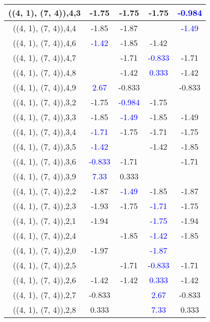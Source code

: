 \documentclass{article}
\begin{document}
\begin{center}
\begin{longtable}{|c|c|c|c|c|}
        	\hline
        	((4, 1), (7, 4)),4,3&-1.75&-1.75&-1.75& \textcolor{blue}{-0.984}\\
        	\hline
        	((4, 1), (7, 4)),4,4&-1.85&-1.87&& \textcolor{blue}{-1.49}\\
        	\hline
        	((4, 1), (7, 4)),4,6& \textcolor{blue}{-1.42}&-1.85&-1.42&\\
        	\hline
        	((4, 1), (7, 4)),4,7&&-1.71& \textcolor{blue}{-0.833}&-1.71\\
        	\hline
        	((4, 1), (7, 4)),4,8&&-1.42& \textcolor{blue}{0.333}&-1.42\\
        	\hline
        	((4, 1), (7, 4)),4,9& \textcolor{blue}{2.67}&-0.833&&-0.833\\
        	\hline
        	((4, 1), (7, 4)),3,2&-1.75& \textcolor{blue}{-0.984}&-1.75&\\
        	\hline
        	((4, 1), (7, 4)),3,3&-1.85& \textcolor{blue}{-1.49}&-1.85&-1.49\\
        	\hline
        	((4, 1), (7, 4)),3,4& \textcolor{blue}{-1.71}&-1.75&-1.71&-1.75\\
        	\hline
        	((4, 1), (7, 4)),3,5& \textcolor{blue}{-1.42}&&-1.42&-1.85\\
        	\hline
        	((4, 1), (7, 4)),3,6& \textcolor{blue}{-0.833}&-1.71&&-1.71\\
        	\hline
        	((4, 1), (7, 4)),3,9& \textcolor{blue}{7.33}&0.333&&\\
        	\hline
        	((4, 1), (7, 4)),2,2&-1.87& \textcolor{blue}{-1.49}&-1.85&-1.87\\
        	\hline
        	((4, 1), (7, 4)),2,3&-1.93&-1.75& \textcolor{blue}{-1.71}&-1.75\\
        	\hline
        	((4, 1), (7, 4)),2,1&-1.94&& \textcolor{blue}{-1.75}&-1.94\\
        	\hline
        	((4, 1), (7, 4)),2,4&&-1.85& \textcolor{blue}{-1.42}&-1.85\\
        	\hline
        	((4, 1), (7, 4)),2,0&-1.97&& \textcolor{blue}{-1.87}&\\
        	\hline
        	((4, 1), (7, 4)),2,5&&-1.71& \textcolor{blue}{-0.833}&-1.71\\
        	\hline
        	((4, 1), (7, 4)),2,6&-1.42&-1.42& \textcolor{blue}{0.333}&-1.42\\
        	\hline
        	((4, 1), (7, 4)),2,7&-0.833&& \textcolor{blue}{2.67}&-0.833\\
        	\hline
        	((4, 1), (7, 4)),2,8&0.333&& \textcolor{blue}{7.33}&0.333\\

\end{longtable}
\end{center}
\end{document}
